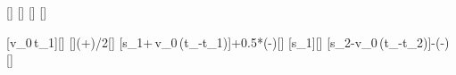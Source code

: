 [\mps]
[\s]
[\s]
[\s]

[v_0\,t_1]{\vNullX*\tOneX}[\m]
[]{(\tOneX+\tTwoX)/2}[\s]
[s_1+\,v_0\,(t_-t_1)]{\sOneX+0.5*\vNullX*(\tTurnX-\tOneX)}[\m]
[s_1]{\sOneX}[\m]
[s_2-v_0\,(t_-t_2)]{\sTwoX-\vNullX*(\tEX-\tTwoX)}[\m]
